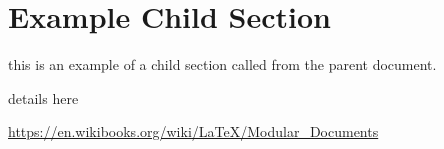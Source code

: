 \section{Example Child Section}
this is an example of a child section called from the parent document.

details here

\url{https://en.wikibooks.org/wiki/LaTeX/Modular_Documents}